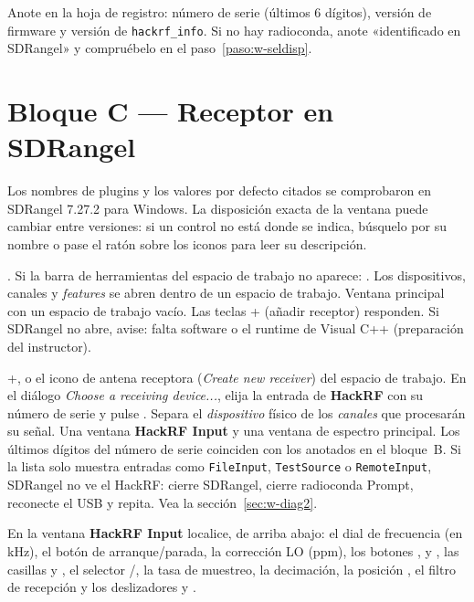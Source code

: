 \begin{checkpoint}
Anote en la hoja de registro: número de serie (últimos 6 dígitos), versión de firmware y versión de \texttt{hackrf\_info}. Si no hay radioconda, anote «identificado en SDRangel» y compruébelo en el paso~\ref{paso:w-seldisp}.
\end{checkpoint}

\section{Bloque C --- Receptor en SDRangel}
\label{sec:w-sdrangel}

\begin{nota}
Los nombres de plugins y los valores por defecto citados se comprobaron en SDRangel 7.27.2 para Windows. La disposición exacta de la ventana puede cambiar entre versiones: si un control no está donde se indica, búsquelo por su nombre o pase el ratón sobre los iconos para leer su descripción.
\end{nota}

{.}
{Si la barra de herramientas del espacio de trabajo no aparece: .}
{Los dispositivos, canales y \emph{features} se abren dentro de un espacio de trabajo.}
{Ventana principal con un espacio de trabajo vacío.}
{Las teclas + (añadir receptor) responden.}
{Si SDRangel no abre, avise: falta software o el runtime de Visual C++ (preparación del instructor).}

{+, o el icono de antena receptora (\emph{Create new receiver}) del espacio de trabajo.}
{En el diálogo \emph{Choose a receiving device...}, elija la entrada de \textbf{HackRF} con su número de serie y pulse .}
{Separa el \emph{dispositivo} físico de los \emph{canales} que procesarán su señal.}
{Una ventana \textbf{HackRF Input} y una ventana de espectro principal.}
{Los últimos dígitos del número de serie coinciden con los anotados en el bloque~B.}
{Si la lista solo muestra entradas como \texttt{FileInput}, \texttt{TestSource} o \texttt{RemoteInput}, SDRangel no ve el HackRF: cierre SDRangel, cierre radioconda Prompt, reconecte el USB y repita. Vea la sección~\ref{sec:w-diag2}.}
\label{paso:w-seldisp}

En la ventana \textbf{HackRF Input} localice, de arriba abajo: el dial de frecuencia (en kHz), el botón de arranque/parada, la corrección LO (ppm), los botones ,  y , las casillas  y , el selector /, la tasa de muestreo, la decimación, la posición , el filtro de recepción y los deslizadores  y .

